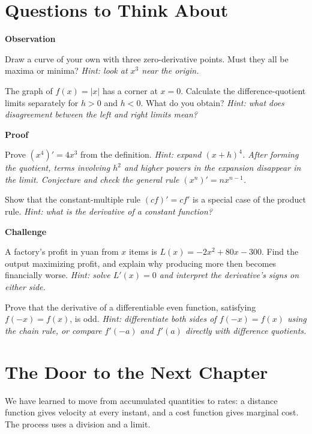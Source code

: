 \section*{Questions to Think About}

\textbf{Observation}
\begin{sikao}
  \item Draw a curve of your own with three zero-derivative points. Must they all be maxima or minima? \emph{Hint: look at $x^3$ near the origin.}
  \item The graph of $f(x)=|x|$ has a corner at $x=0$. Calculate the difference-quotient limits separately for $h>0$ and $h<0$. What do you obtain? \emph{Hint: what does disagreement between the left and right limits mean?}
\end{sikao}

\textbf{Proof}
\begin{sikao}
  \item Prove $(x^4)'=4x^3$ from the definition. \emph{Hint: expand $(x+h)^4$. After forming the quotient, terms involving $h^2$ and higher powers in the expansion disappear in the limit. Conjecture and check the general rule $(x^n)'=nx^{n-1}$.}
  \item Show that the constant-multiple rule $(cf)'=cf'$ is a special case of the product rule. \emph{Hint: what is the derivative of a constant function?}
\end{sikao}

\textbf{Challenge}
\begin{sikao}
  \item A factory's profit in yuan from $x$ items is $L(x)=-2x^2+80x-300$. Find the output maximizing profit, and explain why producing more then becomes financially worse. \emph{Hint: solve $L'(x)=0$ and interpret the derivative's signs on either side.}
  \item Prove that the derivative of a differentiable even function, satisfying $f(-x)=f(x)$, is odd. \emph{Hint: differentiate both sides of $f(-x)=f(x)$ using the chain rule, or compare $f'(-a)$ and $f'(a)$ directly with difference quotients.}
\end{sikao}

\section*{The Door to the Next Chapter}

We have learned to move from accumulated quantities to rates: a distance function gives velocity at every instant, and a cost function gives marginal cost. The process uses a division and a limit.

